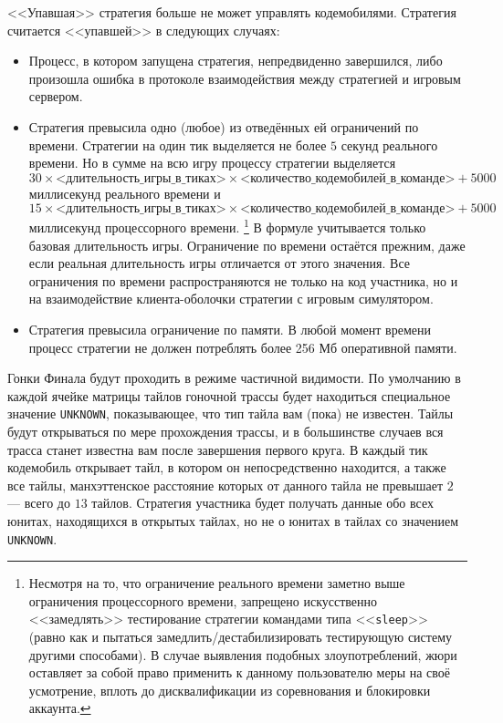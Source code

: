 <<Упавшая>> стратегия больше не может управлять кодемобилями. Стратегия считается <<упавшей>> в следующих случаях:
\begin{itemize}
  \item Процесс, в котором запущена стратегия, непредвиденно завершился, либо произошла ошибка в протоколе взаимодействия между стратегией
        и игровым сервером.
  \item Стратегия превысила одно (любое) из отведённых ей ограничений по времени. Стратегии на один тик выделяется не более $5$ секунд
        реального времени. Но в сумме на всю игру процессу стратегии выделяется
        \begin{equation}
        30\times\textit{<длительность\_игры\_в\_тиках>}\times\textit{<количество\_кодемобилей\_в\_команде>}+5000
        \end{equation}
        миллисекунд реального времени и
        \begin{equation}
        15\times\textit{<длительность\_игры\_в\_тиках>}\times\textit{<количество\_кодемобилей\_в\_команде>}+5000
        \end{equation}
        миллисекунд процессорного времени. \footnote[1]{Несмотря на то, что ограничение реального времени заметно выше ограничения
        процессорного времени, запрещено искусственно <<замедлять>> тестирование стратегии командами типа <<\texttt{sleep}>> (равно как и
        пытаться замедлить/дестабилизировать тестирующую систему другими способами). В случае выявления подобных злоупотреблений, жюри
        оставляет за собой право применить к данному пользователю меры на своё усмотрение, вплоть до дисквалификации из соревнования и
        блокировки аккаунта.} В формуле учитывается только базовая длительность игры. Ограничение по времени остаётся прежним, даже если
        реальная длительность игры отличается от этого значения. Все ограничения по времени распространяются не только на код участника, но
        и на взаимодействие клиента-оболочки стратегии с игровым симулятором.
  \item Стратегия превысила ограничение по памяти. В любой момент времени процесс стратегии не должен потреблять более 256 Мб оперативной
        памяти.
\end{itemize}

Гонки Финала будут проходить в режиме частичной видимости. По умолчанию в каждой ячейке матрицы тайлов гоночной трассы будет находиться
специальное значение \texttt{UNKNOWN}, показывающее, что тип тайла вам (пока) не известен. Тайлы будут открываться по мере прохождения
трассы, и в большинстве случаев вся трасса станет известна вам после завершения первого круга. В каждый тик кодемобиль открывает тайл, в
котором он непосредственно находится, а также все тайлы, манхэттенское расстояние которых от данного тайла не превышает $2$ --- всего до
$13$ тайлов. Стратегия участника будет получать данные обо всех юнитах, находящихся в открытых тайлах, но не о юнитах в тайлах со значением
\texttt{UNKNOWN}.

